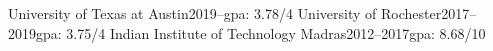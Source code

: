 
    {University of Texas at Austin}{2019--}{\rmsc gpa: 3.78/4}{}
    {University of Rochester}{2017--2019}{\rmsc gpa: 3.75/4}{}
    {Indian Institute of Technology Madras}{2012--2017}{\rmsc gpa: 8.68/10}{}